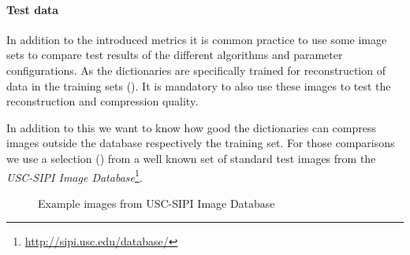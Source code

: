 
\paragraph{Test data}
In addition to the introduced metrics it is common practice to use some image
sets to compare test results of the different algorithms and parameter
configurations. As the dictionaries are specifically trained for
reconstruction of data in the training sets
(). It is mandatory to also use
these images to test the reconstruction and compression quality. 

In addition to this we want to know how good the dictionaries can compress
images outside the database respectively the training set. For
those comparisons we use a selection () from a
well known set of standard test images from the \emph{USC-SIPI Image
Database}\footnote{\url{http://sipi.usc.edu/database/}}. 
\begin{figure}[H]
\centering
\hspace{5mm}
\hspace{5mm}
\caption{Example images from USC-SIPI Image Database}
\label{fig:USC-SIPI}
\end{figure}

